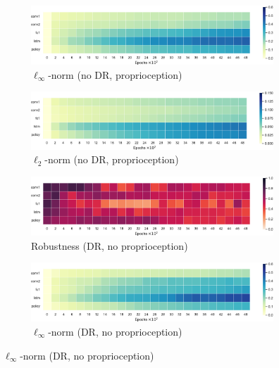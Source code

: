 \begin{figure}[h!]
\begin{subfigure}{0.32\textwidth}
  \end{subfigure}
  \begin{subfigure}{0.32\textwidth}
    \includegraphics[width=\textwidth]{figures/chapter6/robustness/jaco/sensor_std/inf_dist}
    \caption{$\ell_\infty$-norm (no DR, proprioception)}
  \end{subfigure}
  \begin{subfigure}{0.32\textwidth}
    \includegraphics[width=\textwidth]{figures/chapter6/robustness/jaco/sensor_std/l2_dist}
    \caption{$\ell_2$-norm (no DR, proprioception)}
  \end{subfigure}
  \begin{subfigure}{0.32\textwidth}
    \includegraphics[width=\textwidth]{figures/chapter6/robustness/jaco/visual_random/error}
    \caption{Robustness (DR, no proprioception)}
  \end{subfigure}
  \begin{subfigure}{0.32\textwidth}
    \includegraphics[width=\textwidth]{figures/chapter6/robustness/jaco/visual_random/inf_dist}
    \caption{$\ell_\infty$-norm (DR, no proprioception)}
  \end{subfigure}

\end{figure}
